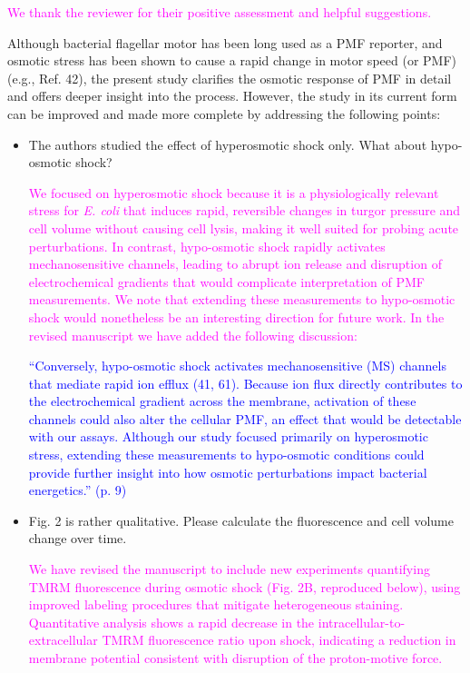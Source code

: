 \documentclass[11pt, letterpaper]{article}%
\newcommand{\revised}{\textcolor{blue}}
\newcommand{\response}{\textcolor{magenta}}
\begin{document}
\noindent \response{We thank the reviewer for their positive assessment and helpful suggestions.\\}

\noindent
Although bacterial flagellar motor has been long used as a PMF reporter, and osmotic stress has been shown to cause a rapid change in motor speed (or PMF) (e.g., Ref. 42), the present study clarifies the osmotic response of PMF in detail and offers deeper insight into the process. However, the study in its current form can be improved and made more complete by addressing the following points:


\begin{itemize}
    \item The authors studied the effect of hyperosmotic shock only. What about hypo-osmotic shock?

    \response{We focused on hyperosmotic shock because it is a physiologically relevant stress for \textit{E. coli} that induces rapid, reversible changes in turgor pressure and cell volume without causing cell lysis, making it well suited for probing acute perturbations. In contrast, hypo-osmotic shock rapidly activates mechanosensitive channels, leading to abrupt ion release and disruption of electrochemical gradients that would complicate interpretation of PMF measurements. We note that extending these measurements to hypo-osmotic shock would nonetheless be an interesting direction for future work. In the revised manuscript we have added the following discussion:}

\begin{mdframed}
\footnotesize\revised{``Conversely, hypo-osmotic shock activates mechanosensitive (MS) channels that mediate rapid ion efflux (41, 61). Because ion flux directly contributes to the electrochemical gradient across the membrane, activation of these channels could also alter the cellular PMF, an effect that would be detectable with our assays. Although our study focused primarily on hyperosmotic stress, extending these measurements to hypo-osmotic conditions could provide further insight into how osmotic perturbations impact bacterial energetics.'' (p. 9)}
\end{mdframed}


\item Fig. 2 is rather qualitative. Please calculate the fluorescence and cell volume change over time.

\response{We have revised the manuscript to include new experiments quantifying TMRM fluorescence during osmotic shock (Fig. 2B, reproduced below), using improved labeling procedures that mitigate heterogeneous staining. Quantitative analysis shows a rapid decrease in the intracellular-to-extracellular TMRM fluorescence ratio upon shock, indicating a reduction in membrane potential consistent with disruption of the proton-motive force.}


\end{itemize}
\end{document}
